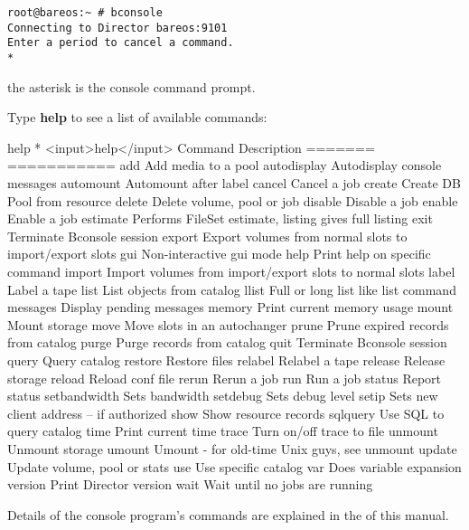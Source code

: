\footnotesize
\begin{verbatim}
root@bareos:~ # bconsole 
Connecting to Director bareos:9101
Enter a period to cancel a command.
*
\end{verbatim}
\normalsize

the asterisk is the console command prompt.

Type {\bf help} to see a list of available commands:

\begin{bconsole}{help}
* <input>help</input>
  Command       Description
  =======       ===========
  add           Add media to a pool
  autodisplay   Autodisplay console messages
  automount     Automount after label
  cancel        Cancel a job
  create        Create DB Pool from resource
  delete        Delete volume, pool or job
  disable       Disable a job
  enable        Enable a job
  estimate      Performs FileSet estimate, listing gives full listing
  exit          Terminate Bconsole session
  export        Export volumes from normal slots to import/export slots
  gui           Non-interactive gui mode
  help          Print help on specific command
  import        Import volumes from import/export slots to normal slots
  label         Label a tape
  list          List objects from catalog
  llist         Full or long list like list command
  messages      Display pending messages
  memory        Print current memory usage
  mount         Mount storage
  move          Move slots in an autochanger
  prune         Prune expired records from catalog
  purge         Purge records from catalog
  quit          Terminate Bconsole session
  query         Query catalog
  restore       Restore files
  relabel       Relabel a tape
  release       Release storage
  reload        Reload conf file
  rerun         Rerun a job
  run           Run a job
  status        Report status
  setbandwidth  Sets bandwidth
  setdebug      Sets debug level
  setip         Sets new client address -- if authorized
  show          Show resource records
  sqlquery      Use SQL to query catalog
  time          Print current time
  trace         Turn on/off trace to file
  unmount       Unmount storage
  umount        Umount - for old-time Unix guys, see unmount
  update        Update volume, pool or stats
  use           Use specific catalog
  var           Does variable expansion
  version       Print Director version
  wait          Wait until no jobs are running
\end{bconsole}

Details of the console program's commands are explained in the
 of this manual.

